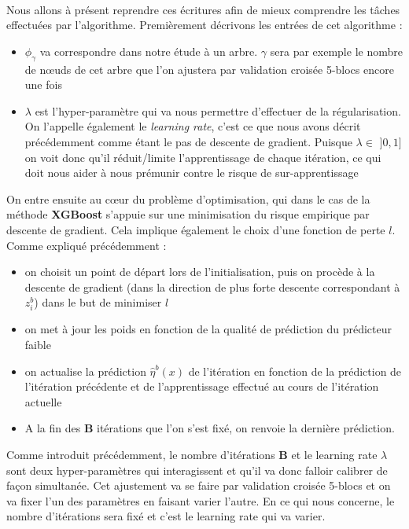 \documentclass[14pt, openany]{article}
\begin{document}
\paragraph{}
Nous allons à présent reprendre ces écritures afin de mieux comprendre les tâches effectuées par l'algorithme. Premièrement décrivons les entrées de cet algorithme :
\begin{itemize}
\item $\phi_{\gamma}$ va correspondre dans notre étude à un arbre. $\gamma$ sera par exemple le nombre de nœuds de cet arbre que l'on ajustera par validation croisée 5-blocs encore une fois
\item $\lambda$ est l'hyper-paramètre qui va nous permettre d'effectuer de la régularisation. On l'appelle également le \textit{learning rate}, c'est ce que nous avons décrit précédemment comme étant le pas de descente de gradient. Puisque $\lambda \in$ $]0,1]$ on voit donc qu'il réduit/limite l'apprentissage de chaque itération, ce qui doit nous aider à nous prémunir contre le risque de sur-apprentissage
\end{itemize}
On entre ensuite au cœur du problème d'optimisation, qui dans le cas de la méthode \textbf{XGBoost} s'appuie sur une minimisation du risque empirique par descente de gradient. Cela implique également le choix d'une fonction de perte $l$. Comme expliqué précédemment :
\begin{itemize}
\item on choisit un point de départ lors de l'initialisation, puis on procède à la descente de gradient (dans la direction de plus forte descente correspondant à $z_{i}^b$) dans le but de minimiser $l$
\item on met à jour les poids en fonction de la qualité de prédiction du \og prédicteur faible \fg{}
\item on actualise la prédiction $\hat{\eta}^b(x)$ de l'itération en fonction de la prédiction de l'itération précédente et de l'apprentissage effectué au cours de l'itération actuelle
\item A la fin des \textbf{B} itérations que l'on s'est fixé, on renvoie la dernière prédiction.
\end{itemize}
Comme introduit précédemment, le nombre d'itérations \textbf{B} et le learning rate \textbf{$\lambda$} sont deux hyper-paramètres qui interagissent et qu'il va donc falloir calibrer de façon simultanée. Cet ajustement va se faire par validation croisée 5-blocs et on va fixer l'un des paramètres en faisant varier l'autre. En ce qui nous concerne, le nombre d'itérations sera fixé et c'est le learning rate qui va varier.
\end{document}
